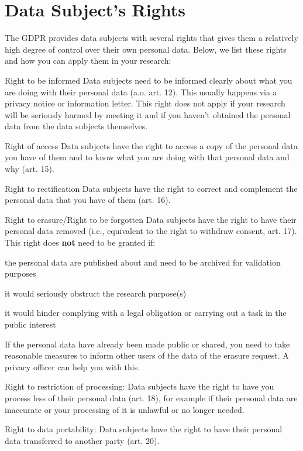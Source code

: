 \documentclass[
]{book}
\begin{document}
\hypertarget{data-subject-rights}{%
\section*{Data Subject's Rights}\label{data-subject-rights}}

The GDPR provides data subjects with several rights that gives them a relatively high degree of control over their own personal data. Below, we list these rights and
how you can apply them in your research:

Right to be informed
Data subjects need to be informed clearly about what you are doing with their personal data
(a.o. art. 12).
This usually happens via a privacy notice or information letter. This right does not apply if
your research will be seriously harmed by meeting it and if you haven't obtained
the personal data from the data subjects themselves.

Right of access
Data subjects have the right to access a copy of the personal data you have of them and to
know what you are doing with that personal data and why (art. 15).

Right to rectification
Data subjects have the right to correct and complement the personal data that you have of them
(art. 16).

Right to erasure/Right to be forgotten
Data subjects have the right to have their personal data removed (i.e., equivalent to the right to withdraw consent,
art. 17). This right does \textbf{not} need to be granted if:

the personal data are published about and need to be archived for validation purposes

it would seriously obstruct the research purpose(s)

it would hinder complying with a legal obligation or carrying out a task in the public interest

If the personal data
have already been made public or shared, you need to take reasonable measures to
inform other users of the data of the erasure request. A privacy officer can help you with this.

Right to restriction of processing:
Data subjects have the right to have you process less of their personal data
(art. 18), for example if their
personal data are inaccurate or your processing of it is unlawful or no longer needed.

Right to data portability:
Data subjects have the right to have their personal data transferred to another party
(art. 20).
\end{document}
